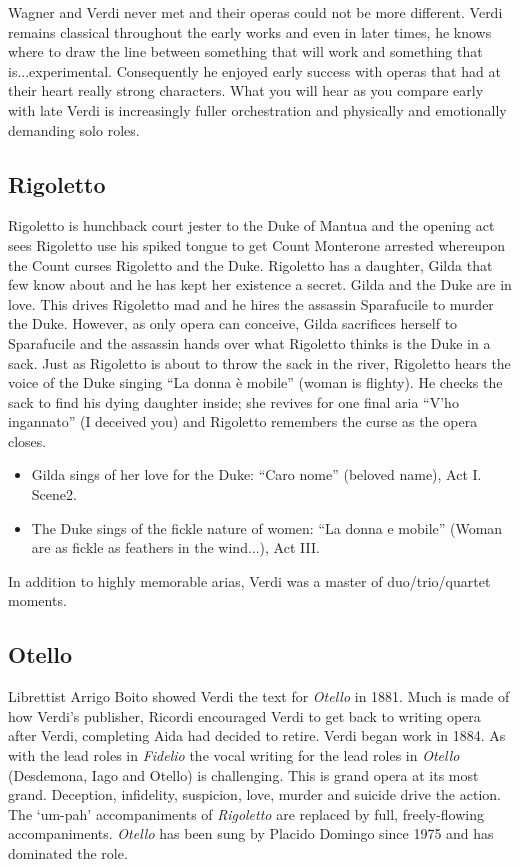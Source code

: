 Wagner and Verdi never met and their operas could not be more different. Verdi remains classical 
throughout the early works and even in later times, he knows where to draw the line between something 
that will work and something that is...experimental. Consequently he enjoyed early success with operas 
that had at their heart really strong characters. What you will hear as you compare early with late 
Verdi is increasingly fuller orchestration and physically and emotionally demanding solo roles.

\subsection{Rigoletto}
Rigoletto is hunchback court jester to the Duke of Mantua and the opening act sees Rigoletto use his spiked 
tongue to get Count Monterone arrested whereupon the Count curses Rigoletto and the Duke. Rigoletto has a daughter, Gilda that few know about and he has kept her existence a secret. Gilda and the Duke are in love. This drives Rigoletto mad and he hires the assassin 
Sparafucile to murder the Duke. However, as only opera can conceive, Gilda sacrifices 
herself to Sparafucile and the assassin hands over what Rigoletto thinks is the Duke in a sack. Just as 
Rigoletto is about to throw the sack in the river, Rigoletto hears the voice of the Duke singing ``La donna 
\`e mobile'' (woman is flighty). He checks the sack to find his dying daughter inside; she revives for one final aria ``V'ho ingannato'' (I deceived you) and Rigoletto remembers the curse as the opera closes.

\begin{itemize}
\item Gilda sings of her love for the Duke: ``Caro nome'' (beloved name), Act I. Scene2. 
\item The Duke sings of the fickle nature of women: ``La donna e mobile'' (Woman are as fickle as feathers in the wind...), Act III. 
\end{itemize}

In addition to highly memorable arias, Verdi was a master of duo/trio/quartet moments.

\subsection{Otello}
Librettist Arrigo Boito showed Verdi the text for \textit{Otello} in 1881. Much is made of how Verdi's publisher, Ricordi encouraged Verdi to get back to writing opera after Verdi, completing Aida had decided to retire. Verdi began work in 1884. As with the lead roles in \textit{Fidelio} the vocal writing for the lead roles in \textit{Otello} (Desdemona, Iago and Otello) is challenging. This is grand opera at its most grand. Deception, infidelity, suspicion, love, murder and suicide drive the action. The `um-pah' accompaniments of \textit{Rigoletto} are replaced by full, freely-flowing accompaniments. \textit{Otello} has been sung by Placido Domingo since 1975 and has dominated the role. 

